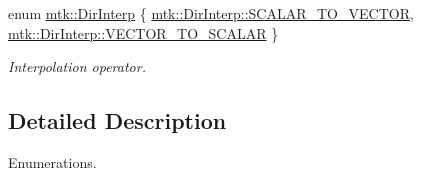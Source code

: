 \begin{DoxyCompactItemize}
enum \hyperlink{group__c02-enums_ga674ec67bd1baa04e5dc06c2bcc351972}{mtk\+::\+Dir\+Interp} \{ \hyperlink{group__c02-enums_ga674ec67bd1baa04e5dc06c2bcc351972a53facfbeb6725b2bd220c8d9811a0673}{mtk\+::\+Dir\+Interp\+::\+S\+C\+A\+L\+A\+R\+\_\+\+T\+O\+\_\+\+V\+E\+C\+T\+O\+R}, 
\hyperlink{group__c02-enums_ga674ec67bd1baa04e5dc06c2bcc351972a6b389c8391a900c481d8c96c6045f468}{mtk\+::\+Dir\+Interp\+::\+V\+E\+C\+T\+O\+R\+\_\+\+T\+O\+\_\+\+S\+C\+A\+L\+A\+R}
 \}
\begin{DoxyCompactList}\small\item\em Interpolation operator. \end{DoxyCompactList}\end{DoxyCompactItemize}


\subsection{Detailed Description}
Enumerations. 

